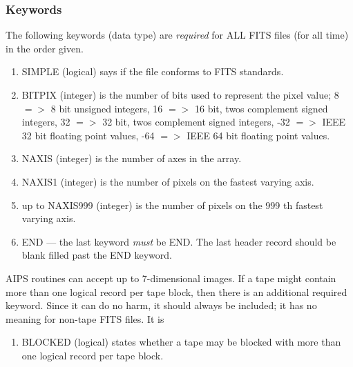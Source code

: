 \subsubsection{Keywords }
The following keywords (data type) are {\it required} for ALL FITS files
(for all time) in the order given.
\begin{enumerate} %
\item SIMPLE (logical) says if the file conforms to FITS standards.
\item BITPIX (integer) is the number of bits used to represent the pixel
value; 8 $=>$ 8 bit unsigned integers, 16 $=>$ 16 bit, twos complement
signed integers, 32 $=>$ 32 bit, twos complement signed integers, -32
$=>$ IEEE 32 bit floating point values, -64 $=>$ IEEE 64 bit floating
point values.
\item NAXIS (integer) is the number of axes in the array.
\item NAXIS1 (integer) is the number of pixels on the fastest varying axis.
\item up to NAXIS999 (integer) is the number of pixels on the 999 th fastest
varying axis.
\item END --- the last keyword {\it must} be END.  The last header record should
be blank filled past the END keyword.
\end{enumerate} %
AIPS routines can accept up to 7-dimensional images.  If a tape might
contain more than one logical record per tape block, then there is an
additional required keyword.  Since it can do no harm, it should
always be included; it has no meaning for non-tape FITS files.  It is
\begin{enumerate} %
\item BLOCKED (logical) states whether a tape may be blocked with more than
one logical record per tape block.
\end{enumerate} %

